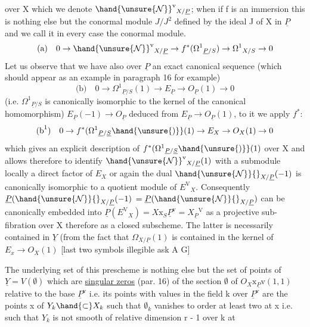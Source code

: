 
over X which we denote $\hand{\unsure{\mathcal{N}}}^{\mathrm{v}}{}_{X/\underline{P}}$; when if f is an immersion this is
nothing else but the conormal module $J/J^2$ defined by the ideal J
of X in $\underline{P}$ and we call it in every case the conormal module.
\[ \text{(a)}\quad 0 \rightarrow \hand{\unsure{\mathcal{N}}}^{\mathrm{v}}{}_{X/\underline{P}} \rightarrow f^*(\Omega^1{}_{\underline{P}/S}) \rightarrow \Omega^1{}_{X/S} \rightarrow 0 \]
Let us observe that we have also over $\underline{P}$ an exact canonical
sequence (which should appear as an example in paragraph 16 for
example)
\[ \text{(b)}\quad 0 \rightarrow \Omega^1{}_{\underline{P}/S}(1) \rightarrow E_{\underline{P}} \rightarrow O_{\underline{P}}(1) \rightarrow 0 \]
(i.e. $\Omega^1{}_{\underline{P}/S}$ is canonically isomorphic to the kernel of the
canonical homomorphism) $E_{\underline{P}}(-1) \rightarrow O_{\underline{P}}$ deduced from
$E_{\underline{P}} \rightarrow O_{\underline{P}}(1)$, to it we apply $f^*$:
\[ \text{(b}^1\text{)}\quad 0 \rightarrow f^*(\Omega^1{}_{\underline{P}/\underline{S}}\hand{\unsure{)}}(1) \rightarrow E_X \rightarrow O_X(1) \rightarrow 0 \]
which gives an explicit description of $f^*(\Omega^1{}_{\underline{P}/\underline{S}}\hand{\unsure{)}}(1)$ over X and
allows therefore to identify $\hand{\unsure{\mathcal{N}}}^{\mathrm{v}}{}_{X/\underline{P}}(1)$ with a submodule locally a
direct factor of $E_X$ or again the dual $\hand{\unsure{\mathcal{N}}}{}_{X/\underline{P}}(-1)$ is canonically
isomorphic to a quotient module of $E^{\mathrm{V}}{}_X$. Consequently $\underline{P}(\hand{\unsure{\mathcal{N}}}{}_{X/\underline{P}}(-1)$
$= \underline{P}(\hand{\unsure{\mathcal{N}}}{}_{X/\underline{P}})$ can be canonically embedded into $\underline{P}(E^{\mathrm{V}}{}_X) = X\mathrm{x}_S\underline{P}^{\mathrm{v}} = X_{\underline{P}}{}^{\mathrm{V}}$
as a projective sub-fibration over X therefore as a closed
subscheme. The latter is necessarily contained in $\underline{Y}$ (from the
fact that $\Omega_{X/\underline{P}}(1)$ is contained in the kernel of $E_x \rightarrow O_X(1)$ [last
two symbols illegible ask A G]

The underlying set of this prescheme is nothing else but the
set of points of $\underline{Y} = V(\emptyset)$ which are \uline{singular zeros} (par. 16) of
the section $\emptyset$ of $O_X\mathrm{x}_{\underline{P}}\mathrm{v}(1, 1)$ relative to the base $\underline{P}^{\mathrm{v}}$ i.e. its
points with values in the field k over $\underline{P}^{\mathrm{v}}$ are the points x of
$Y_k \hand{\subset} X_k$ such that $\emptyset_k$ vanishes to order at least two at x i.e.
such that $Y_k$ is not smooth of relative dimension r - 1 over k at
